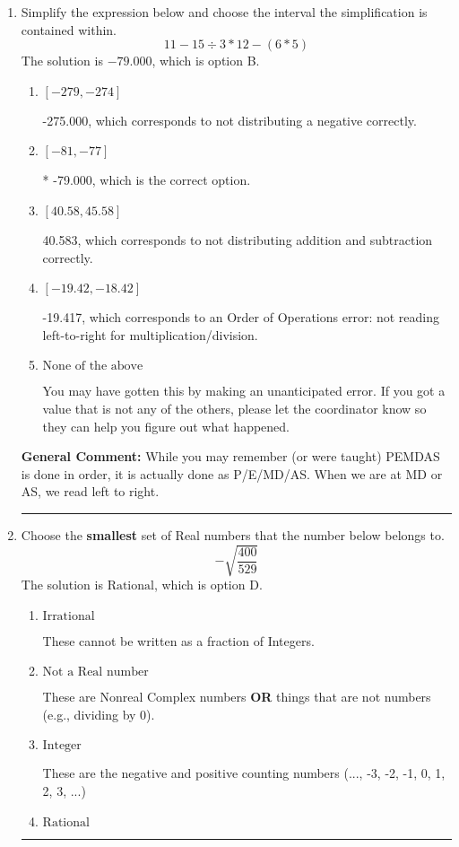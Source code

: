 \documentclass{extbook}[14pt]
\newcommand{\litem}[1]{\item #1

\rule{\textwidth}{0.4pt}}
\begin{document}
\begin{enumerate}
{ Irrational numbers are more than just square root of 3: adding or subtracting values from square root of 3 is also irrational.
}
\litem{
Simplify the expression below and choose the interval the simplification is contained within.
\[ 11 - 15 \div 3 * 12 - (6 * 5) \]
The solution is \( -79.000 \), which is option B.\begin{enumerate}[label=\Alph*.]
\item \( [-279, -274] \)

 -275.000, which corresponds to not distributing a negative correctly.
\item \( [-81, -77] \)

* -79.000, which is the correct option.
\item \( [40.58, 45.58] \)

 40.583, which corresponds to not distributing addition and subtraction correctly.
\item \( [-19.42, -18.42] \)

 -19.417, which corresponds to an Order of Operations error: not reading left-to-right for multiplication/division.
\item \( \text{None of the above} \)

 You may have gotten this by making an unanticipated error. If you got a value that is not any of the others, please let the coordinator know so they can help you figure out what happened.
\end{enumerate}

\textbf{General Comment:} While you may remember (or were taught) PEMDAS is done in order, it is actually done as P/E/MD/AS. When we are at MD or AS, we read left to right.
}
\litem{
Choose the \textbf{smallest} set of Real numbers that the number below belongs to.
\[ -\sqrt{\frac{400}{529}} \]
The solution is \( \text{Rational} \), which is option D.\begin{enumerate}[label=\Alph*.]
\item \( \text{Irrational} \)

These cannot be written as a fraction of Integers.
\item \( \text{Not a Real number} \)

These are Nonreal Complex numbers \textbf{OR} things that are not numbers (e.g., dividing by 0).
\item \( \text{Integer} \)

These are the negative and positive counting numbers (..., -3, -2, -1, 0, 1, 2, 3, ...)
\item \( \text{Rational} \)


\end{enumerate}}
\end{enumerate}
\end{document}
